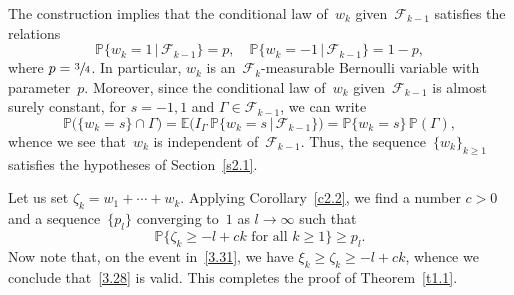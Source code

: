 \documentclass[JEP,XML,SOM,Unicode,ThmDefs]{cedram}
\let\mathcal\mathscr
\theoremstyle{plain}
\numberwithin{equation}{section}
\newcommand{\IP}{{\mathbb P}}
\newcommand{\E}{{\mathbb E}}
\newcommand{\FF}{{\mathcal F}}
\begin{document}
The construction implies that the conditional law of~$w_k$ given~$\FF_{k-1}$ satisfies the relations
\begin{equation} \label{2.1}
\IP\{w_k=1\,|\,\FF_{k-1}\}=p, \quad \IP\{w_k=-1\,|\,\FF_{k-1}\}=1-p,
\end{equation}
where $p=\sfrac34$. In particular, $w_k$ is an~$\FF_k$-measurable Bernoulli variable with parameter~$p$. Moreover, since the conditional law of~$w_k$ given~$\FF_{k-1}$ is almost surely constant, for $s=-1,1$ and $\Gamma\in\FF_{k-1}$, we can write
\[
\IP\bigl(\{w_k=s\}\cap \Gamma\bigr)
=\E\bigl(I_\Gamma\,\IP\{w_k=s\,|\,\FF_{k-1}\}\bigr)=\IP\{w_k=s\}\,\IP(\Gamma),
\]
whence we see that~$w_k$ is independent of~$\FF_{k-1}$. Thus, the sequence~$\{w_k\}_{k\ge1}$ satisfies the hypotheses of Section~\ref{s2.1}.

Let us set $\zeta_k=w_1+\cdots+w_k$. Applying Corollary~\ref{c2.2}, we find a number $c>0$ and a sequence~$\{p_l\}$ converging to~$1$ as $l\to\infty$ such that
\begin{equation} \label{3.31}
\IP\{\zeta_k\ge -l+ck\text{ for all $k\ge1$}\} \ge p_l.
\end{equation}
Now note that, on the event in~\eqref{3.31}, we have $\xi_k\ge\zeta_k\ge -l+ck$, whence we conclude that~\eqref{3.28} is valid. This completes the proof of Theorem~\ref{t1.1}.
\end{document}
